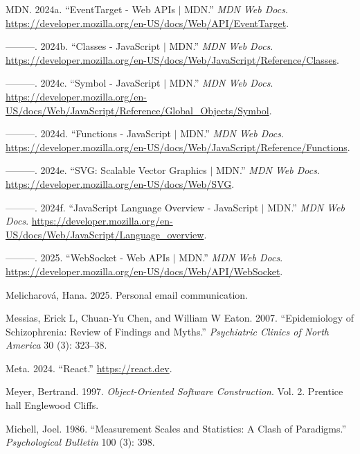 \documentclass[
]{book}
\newlength{\cslhangindent}
\newenvironment{CSLReferences}[2] %
 {\begin{list}{}{%
  \setlength{\itemindent}{0pt}
  \setlength{\leftmargin}{0pt}
  \setlength{\parsep}{0pt}
  \ifodd #1
   \setlength{\leftmargin}{\cslhangindent}
   \setlength{\itemindent}{-1\cslhangindent}
  \fi
  \setlength{\itemsep}{#2\baselineskip}}}
 {\end{list}}
\theoremstyle{definition}
\theoremstyle{definition}
\theoremstyle{definition}
\theoremstyle{definition}
\theoremstyle{remark}
\begin{document}
\begin{CSLReferences}{1}{0}
MDN. 2024a. {``EventTarget - Web APIs {\(\vert\)} MDN.''} \emph{MDN Web Docs}. \url{https://developer.mozilla.org/en-US/docs/Web/API/EventTarget}.

---------. 2024b. {``Classes - JavaScript {\(\vert\)} MDN.''} \emph{MDN Web Docs}. \url{https://developer.mozilla.org/en-US/docs/Web/JavaScript/Reference/Classes}.

---------. 2024c. {``Symbol - JavaScript {\(\vert\)} MDN.''} \emph{MDN Web Docs}. \url{https://developer.mozilla.org/en-US/docs/Web/JavaScript/Reference/Global_Objects/Symbol}.

---------. 2024d. {``Functions - JavaScript {\(\vert\)} MDN.''} \emph{MDN Web Docs}. \url{https://developer.mozilla.org/en-US/docs/Web/JavaScript/Reference/Functions}.

---------. 2024e. {``SVG: Scalable Vector Graphics {\(\vert\)} MDN.''} \emph{MDN Web Docs}. \url{https://developer.mozilla.org/en-US/docs/Web/SVG}.

---------. 2024f. {``JavaScript Language Overview - JavaScript {\(\vert\)} MDN.''} \emph{MDN Web Docs}. \url{https://developer.mozilla.org/en-US/docs/Web/JavaScript/Language_overview}.

---------. 2025. {``{WebSocket - Web APIs {\(\vert\)} MDN}.''} \emph{MDN Web Docs}. \url{https://developer.mozilla.org/en-US/docs/Web/API/WebSocket}.

Melicharová, Hana. 2025. Personal email communication.

Messias, Erick L, Chuan-Yu Chen, and William W Eaton. 2007. {``Epidemiology of Schizophrenia: Review of Findings and Myths.''} \emph{Psychiatric Clinics of North America} 30 (3): 323--38.

Meta. 2024. {``React.''} \url{https://react.dev}.

Meyer, Bertrand. 1997. \emph{Object-Oriented Software Construction}. Vol. 2. Prentice hall Englewood Cliffs.

Michell, Joel. 1986. {``Measurement Scales and Statistics: A Clash of Paradigms.''} \emph{Psychological Bulletin} 100 (3): 398.


\end{CSLReferences}
\end{document}
